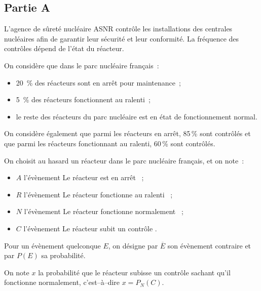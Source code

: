 \medskip

\subsection*{Partie A}

L'agence de sûreté nucléaire ASNR contrôle les installations des centrales nucléaires afin de garantir leur sécurité et leur conformité. La fréquence des contrôles dépend de l'état du réacteur.

On considère que dans le parc nucléaire français~:
\begin{itemize}[noitemsep]
\item 20~\% des réacteurs sont en arrêt pour maintenance~;
\item 5~\% des réacteurs fonctionnent au ralenti~;
\item le reste des réacteurs du parc nucléaire est en état de fonctionnement normal.
\end{itemize}

On considère également que parmi les réacteurs en arrêt, 85\,\% sont contrôlés et que parmi les réacteurs fonctionnant au ralenti, 60\,\% sont contrôlés.

On choisit au hasard un réacteur dans le parc nucléaire français, et on note~:
\begin{itemize}[noitemsep]
\item $A$ l'évènement \og Le réacteur est en arrêt \fg~;
\item $R$ l'évènement \og Le réacteur fonctionne au ralenti \fg~;
\item $N$ l'évènement \og Le réacteur fonctionne normalement \fg~;
\item $C$ l'évènement \og Le réacteur subit un contrôle \fg.
\end{itemize}

Pour un évènement quelconque $E$, on désigne par $\overline{E}$ son évènement contraire et par $P(E)$ sa probabilité.

On note $x$ la probabilité que le réacteur subisse un contrôle sachant qu'il fonctionne normalement, c'est--à--dire $x = P_N(C)$.

\medskip


